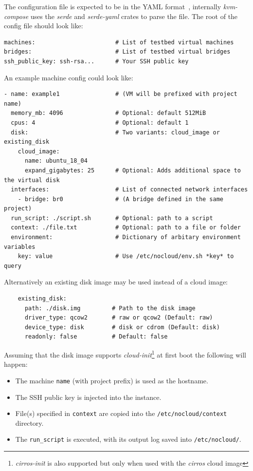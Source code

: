 \documentclass[
    author={Jacob Daniel Halsey},
    supervisor={Prof. Awais Rashid},
    degree={BSc},
    title={Building a Testbed for Evaluating Privacy Enhancing Technologies  (PETs)},
    subtitle={},
    type={software development},
    year={2021}
]{dissertation}
\begin{document}
The configuration file is expected to be in the YAML format~\cite{yaml}, internally \emph{kvm-compose}
uses the \emph{serde} and \emph{serde-yaml} crates to parse the file.
The root of the config file should look like:

\begin{verbatim}
machines:                       # List of testbed virtual machines
bridges:                        # List of testbed virtual bridges
ssh_public_key: ssh-rsa...      # Your SSH public key
\end{verbatim}

An example machine config could look like:

\begin{verbatim}
- name: example1                # (VM will be prefixed with project name)
  memory_mb: 4096               # Optional: default 512MiB
  cpus: 4                       # Optional: default 1
  disk:                         # Two variants: cloud_image or existing_disk 
    cloud_image:
      name: ubuntu_18_04
      expand_gigabytes: 25      # Optional: Adds additional space to the virtual disk
  interfaces:                   # List of connected network interfaces
    - bridge: br0               # (A bridge defined in the same project)
  run_script: ./script.sh       # Optional: path to a script
  context: ./file.txt           # Optional: path to a file or folder
  environment:                  # Dictionary of arbitary environment variables
    key: value                  # Use /etc/nocloud/env.sh *key* to query
\end{verbatim}

Alternatively an existing disk image may be used instead of a cloud image:

\begin{verbatim}
    existing_disk:
      path: ./disk.img         # Path to the disk image
      driver_type: qcow2       # raw or qcow2 (Default: raw)
      device_type: disk        # disk or cdrom (Default: disk)
      readonly: false          # Default: false
\end{verbatim}


Assuming that the disk image supports \emph{cloud-init}\footnote{
	\emph{cirros-init} is also supported but only when used with the \emph{cirros} cloud image
} at first boot the following will happen:

\begin{singlespace}
	\begin{itemize}
		\item The machine \texttt{name} (with project prefix) is used as the hostname.
		\item The SSH public key is injected into the instance.
		\item File(s) specified in \texttt{context} are copied into the \texttt{/etc/nocloud/context} directory.
		\item The \texttt{run\_script} is executed, with its output log saved into \texttt{/etc/nocloud/}.
	\end{itemize}
\end{singlespace}
\end{document}
